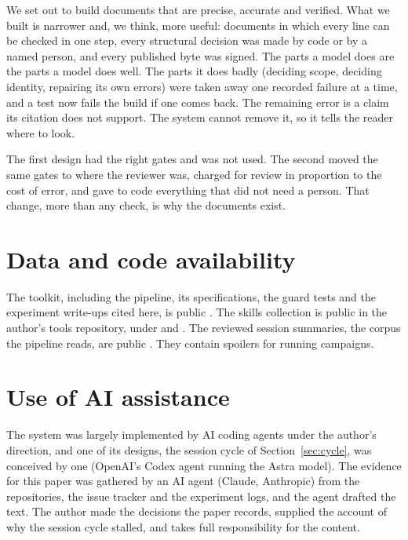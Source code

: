 \documentclass[11pt]{article}
\begin{document}
We set out to build documents that are precise, accurate and verified. What we built is
narrower and, we think, more useful: documents in which every line can be checked in one
step, every structural decision was made by code or by a named person, and every
published byte was signed. The parts a model does are the parts a model does well. The
parts it does badly (deciding scope, deciding identity, repairing its own errors) were
taken away one recorded failure at a time, and a test now fails the build if one comes
back. The remaining error is a claim its citation does not support. The system cannot
remove it, so it tells the reader where to look.

The first design had the right gates and was not used. The second moved the same gates
to where the reviewer was, charged for review in proportion to the cost of error, and
gave to code everything that did not need a person. That change, more than any check,
is why the documents exist.

\section*{Data and code availability}

The toolkit, including the pipeline, its specifications, the guard tests and the
experiment write-ups cited here, is public \citep{roussos2026cg}. The skills collection is public in the
author's tools repository, under  and
 \citep{roussos2026mytools}. The reviewed session summaries,
the corpus the pipeline reads, are public \citep{roussos2026campaigns}. They contain
spoilers for running campaigns.

\section*{Use of AI assistance}

The system was largely implemented by AI coding agents under the author's direction,
and one of its designs, the session cycle of Section~\ref{sec:cycle}, was conceived by
one (OpenAI's Codex agent running the Astra model). The evidence for this paper was gathered by an AI agent (Claude, Anthropic) from
the repositories, the issue tracker and the experiment logs, and the agent drafted the
text. The author made the decisions the paper records, supplied the account of why the
session cycle stalled, and takes full responsibility for the content.
\end{document}
